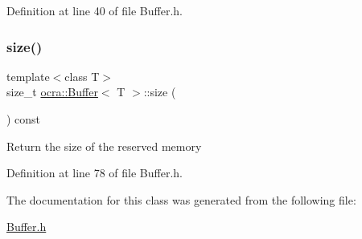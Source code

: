 Definition at line 40 of file Buffer.\+h.

\hypertarget{classocra_1_1Buffer_a181e8573c657bbc9a09a15628be00c4f}{}\label{classocra_1_1Buffer_a181e8573c657bbc9a09a15628be00c4f} 
\subsubsection{\texorpdfstring{size()}{size()}}
{\footnotesize\ttfamily template$<$class T$>$ \\
size\+\_\+t \hyperlink{classocra_1_1Buffer}{ocra\+::\+Buffer}$<$ T $>$\+::size (\begin{DoxyParamCaption}{ }\end{DoxyParamCaption}) const\hspace{0.3cm}{\ttfamily [inline]}}

Return the size of the reserved memory 

Definition at line 78 of file Buffer.\+h.



The documentation for this class was generated from the following file\+:\begin{DoxyCompactItemize}
\item 
\hyperlink{Buffer_8h}{Buffer.\+h}\end{DoxyCompactItemize}
